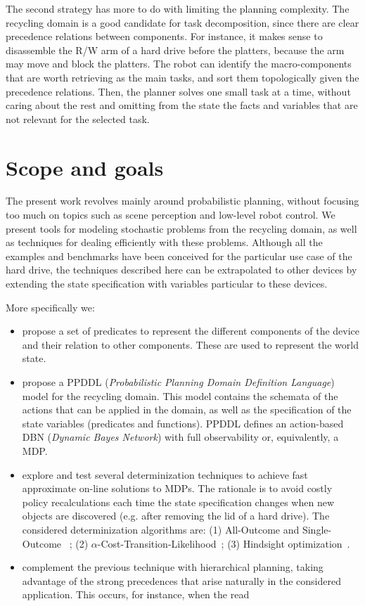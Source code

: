 \documentclass[../root.tex]{subfiles}
\begin{document}
The second strategy has more to do with limiting the planning complexity.
The recycling domain is a good candidate for task decomposition, since
there are clear precedence relations between components. For instance,
it makes sense to disassemble the R/W arm of a hard drive before the
platters, because the arm may move and block the platters. The robot
can identify the macro-components that are worth retrieving as the main
tasks, and sort them topologically given the precedence relations. Then,
the planner solves one small task at a time, without caring about
the rest and omitting from the state the facts and variables that are not
relevant for the selected task.

\section{Scope and goals}

The present work revolves mainly around probabilistic planning, without focusing too much
on topics such as scene perception and low-level robot control.
We present tools for modeling stochastic problems from the recycling
domain, as well as techniques for
dealing efficiently with these problems. Although all the examples and benchmarks
have been conceived for the particular use case of the hard drive,
the techniques described here can be extrapolated to other devices by extending
the state specification with variables particular to these devices.

More specifically we:
\begin{itemize}
	\item propose a set of predicates to represent the different components of
	the device and their relation to other components. These are used to represent
	the world state.
	\item propose a PPDDL (\emph{Probabilistic Planning Domain Definition Language})
	model for the recycling domain. This model contains the schemata of the actions
	that can be applied in the domain, as well as the specification of the
	state variables (predicates and functions). PPDDL defines an action-based
	DBN (\emph{Dynamic Bayes Network}) with full observability or, equivalently,
	a MDP.
	\item explore and test several determinization techniques to achieve fast
	approximate on-line solutions to MDPs. The rationale is to avoid costly policy
	recalculations each time the state specification changes when new objects
	are discovered (e.g. after removing the lid of a hard drive). The considered
	determinization algorithms are: (1) All-Outcome and Single-Outcome%
	~\cite{yoon2007ffreplan};
	(2) $ \alpha $-Cost-Transition-Likelihood~\cite{kaelbling2013integrated};
	(3) Hindsight optimization~\cite{yoon2008probabilistic,yoon2010improving}.
	\item complement the previous technique with hierarchical planning, taking
	advantage of the strong precedences that arise naturally in the
	considered application. This occurs, for instance, when the read
\end{itemize}
\end{document}
